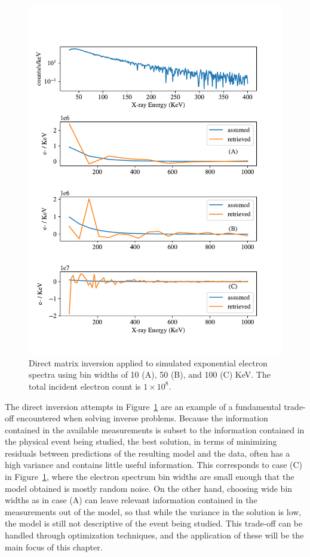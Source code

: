 \begin{figure}[p]
\label{direct_inversion_example}
\centering
\includegraphics[width=\textwidth]{figures/chapter_4/direct_inversion_example/direct_inversion_example7.pdf}
\caption{Direct matrix inversion applied to simulated exponential electron spectra using bin widths of 10 (A), 50 (B), and 100 (C) KeV. The total incident electron count is $1\times10^8$.}
\end{figure}

The direct inversion attempts in Figure~\ref{direct_inversion_example} are an example of a fundamental trade-off encountered when solving inverse problems. Because the information contained in the available measurements is subset to the information contained in the physical event being studied, the best solution, in terms of minimizing residuals between predictions of the resulting model and the data, often has a high variance and contains little useful information. This corresponds to case (C) in Figure~\ref{direct_inversion_example}, where the electron spectrum bin widths are small enough that the model obtained is mostly random noise. On the other hand, choosing wide bin widths as in case (A) can leave relevant information contained in the measurements out of the model, so that while the variance in the solution is low, the model is still not descriptive of the event being studied. This trade-off can be handled through optimization techniques, and the application of these will be the main focus of this chapter.

